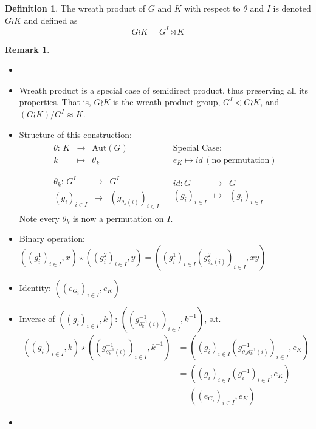 \documentclass{book}
\newcommand{\Aut}[1]{\textrm{Aut}( #1 )}
\theoremstyle{definition}
\newtheorem{definition}[lemma]{Definition}
\theoremstyle{remarkstyle}
\newtheorem*{remark}{Remark}%
\begin{document}
\begin{definition}
    The wreath product of $G$ and $K$ with respect to $\theta$ and $I$ is denoted $G\wr K$ and defined as $$G\wr K = G^{I}\rtimes K $$
\end{definition}
\begin{remark}
    \begin{itemize}
        \item[]
        \item Wreath product is a special case of semidirect product, thus preserving all its properties. That is, $G\wr K$ is the wreath product group, $G^{I} \triangleleft G\wr K$, and $(G\wr K)/G^{I} \approx K$.
        \item Structure of this construction:
        $$
        \begin{array}{cc}
            \begin{array}{rcl}
                \theta: \, K  & \rightarrow & \Aut{G} \\
                k & \mapsto & \theta_{k}
            \end{array} & \begin{array}{c}
                \textrm{Special Case:} \\
                 e_{K} \mapsto id \, (\textrm{no permutation})
            \end{array}  \\
            & \\
             \begin{array}{rcl}
                \theta_{k} : \, G^{I} &\rightarrow & G^{I} \\
                (g_{i})_{i\in I} &\mapsto & (g_{\theta_k (i)})_{i\in I}
            \end{array} & \begin{array}{rcl}
                id: G &\rightarrow & G \\
                (g_{i})_{i\in I} &\mapsto & (g_{i})_{i\in I}
            \end{array}
        \end{array}
        $$
        Note every $\theta_{k}$ is now a permutation on $I$.
        \item Binary operation: $((g^{1}_{i})_{i\in I},x) \star ((g^{2}_{i})_{i\in I},y) = ((g^{1}_{i})_{i\in I}(g^{2}_{\theta_x (i)})_{i\in I},xy)  $
        \item Identity: $((e_{G_i})_{i\in I}, e_{K})$
        \item Inverse of $((g_{i})_{i\in I}, k) $: $((g^{-1}_{\theta^{-1}_k (i)})_{i\in I}, k^{-1}) $, s.t. 
        \begin{align*}
            ((g_{i})_{i\in I}, k) \star ((g^{-1}_{\theta^{-1}_k (i)})_{i\in I}, k^{-1}) &= ((g_{i})_{i\in I}(g^{-1}_{\theta_k\theta^{-1}_k (i)})_{i\in I}, e_{K}) \\
            &= ((g_{i})_{i\in I}(g^{-1}_{i})_{i\in I}, e_{K}) \\
            &= ((e_{G_i})_{i\in I}, e_{K})
        \end{align*}
        \item[] 
    \end{itemize}
\end{remark}
\end{document}
